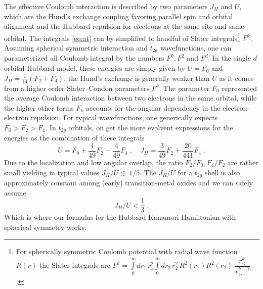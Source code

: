 The effective Coulomb interaction is described by two parameters $J_H$ and $U$, which are the Hund's exchange coupling favoring parallel spin and orbital alignment and the Hubbard repulsion for electrons at the same site and same orbital. The integrals \eqref{eq:at}  can by simplified to handful of Slater integrals\footnote{For spherically symmetric Coulomb potential with radial wave function $R(r)$ the Slater integrals are $F^k=
\int\limits_0^\infty dr_1 \, r_1^2
\int\limits_0^\infty dr_2 \, r_2^2 \,
R^2(r_1)R^2(r_2) \; \dfrac{r_{<}^k}{r_{>}^{k+1}}
 \,  $.} $F^k$.
Assuming spherical symmetric interaction and $t_{\text{2g}}$ wavefunctions, one can parameterized all Coulomb integral by the numbers $F^0, F^2 $ and $F^d$.
In the single $d$ orbital Hubbard model, these energies are simply given by \cite{Sugano_1970} $U=F_0$ and $J_H=\frac{1}{14}\left(F_2+F_4\right)$, the Hund's exchange is generally weaker than $U$ as it comes from a higher order Slater–Condon parameters $F^k$.
The parameter $F_0$ represented the average Coulomb interaction between two electrons in the same orbital, while the higher other terms $F_k$ accounts for the angular dependency in the electron-electron repulsion.
For typical wavefunctions, one generically expects $F_0>F_2> F_4$.
In $t_{2g}$ orbitals, on get the more evolvent expressions for the energies as the combination of these integrals \cite{Georges_2013}
\begin{equation}
    U=F_0 + \frac{4}{49} F_2+ \frac{4}{49}
 F_4 \; , \quad
    J_H=\frac{3}{49} F_2+ \frac{20}{441}
 F_4 \; .
\end{equation}
Due to the localization and low angular overlap, the ratio $F_2/F_0, F_4/F_2$ are rather small yielding in typical values $J_H / U \lesssim \, 1/5$.
The $J_H/U$ for a $t_{2g}$ shell is also approximately constant among (early) transition-metal oxides and we can safely assume
\begin{equation}
    J_H/U < \frac{1}{3} \; .
\end{equation} Which is where our formulas for the Hubbard-Kanamori Hamiltonian with spherical symmetry works.

